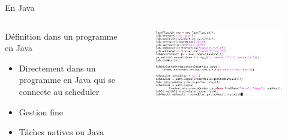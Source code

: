 \documentclass{beamer}
\begin{document}
\begin{frame}{En Java}
	\begin{columns}
	\begin{column}[l]{0.4\linewidth}
        \begin{exampleblock}{Définition dans un programme en Java}
            \begin{itemize}
                \item Directement dans un programme en Java qui se connecte au scheduler
                \item Gestion fine
                \item T\^aches natives ou Java
            \end{itemize}
        \end{exampleblock}
	\end{column}
	\begin{column}[r]{0.6\linewidth}
        \vspace{-1cm}
        \begin{figure}
            \centering
            \includegraphics[scale=0.32]{jobjava.png}
        \end{figure}
	\end{column}
	\end{columns}
    
\end{frame}
\end{document}
